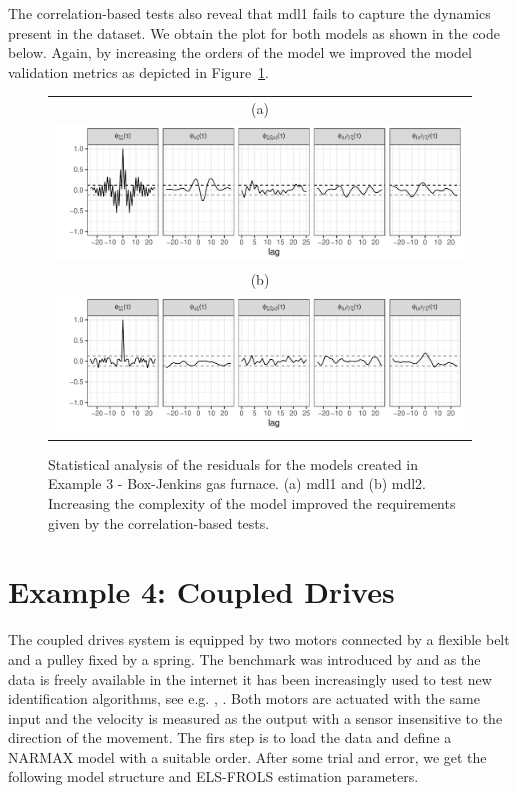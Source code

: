 \documentclass[preprint,12pt, a4paper]{elsarticle}
\begin{document}
The correlation-based tests also reveal that mdl1 fails to capture the dynamics present in the dataset. We obtain the plot for both models as shown in the code below. Again, by increasing the orders of the model we improved the model validation metrics as depicted in Figure~\ref{fig:ex3xc}.

\begin{figure}[t!]
	\centering
	\begin{tabular}{c}
		(a) \\
		\includegraphics[width=15cm,keepaspectratio]{ex3xc1}  \\ 
		(b) \\
		\includegraphics[width=15cm,keepaspectratio]{ex3xc2}
	\end{tabular}
	\caption{Statistical analysis of the residuals for the models created in Example 3 - Box-Jenkins gas furnace. (a) mdl1 and (b) mdl2. Increasing the complexity of the model improved the requirements given by the correlation-based tests.} \label{fig:ex3xc}
\end{figure}



\section{Example 4: Coupled Drives}

The coupled drives system is equipped by two motors connected by a flexible belt and a pulley fixed by a spring. The benchmark was introduced by \cite{Wigren2013} and as the data is freely available in the internet it has been increasingly used to test new identification algorithms, see e.g. \cite{Sabahi2016}, \cite{Wachel2017}. Both motors are actuated with the same input and the velocity is measured as the output with a sensor insensitive to the direction of the movement. The firs step is to load the data and define a NARMAX model with a suitable order. After some trial and error, we get the following model structure and ELS-FROLS estimation parameters.
\end{document}
